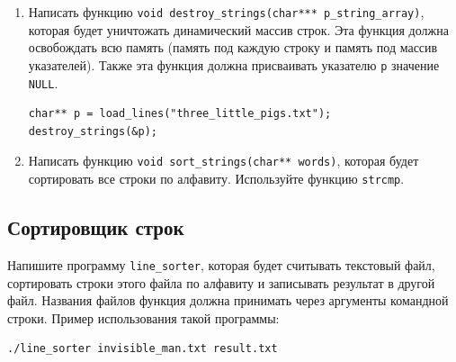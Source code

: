 \documentclass{article}
\begin{document}
\begin{enumerate}
\item Написать функцию \texttt{void destroy\_strings(char*** p\_string\_array)}, которая будет уничтожать динамический массив строк. Эта функция должна освобождать всю память (память под каждую строку и память под массив указателей). Также эта функция должна присваивать указателю \texttt{p} значение \texttt{NULL}.
\begin{lstlisting}
char** p = load_lines("three_little_pigs.txt");
destroy_strings(&p);
\end{lstlisting}

\item Написать функцию \texttt{void sort\_strings(char** words)}, которая будет сортировать все строки по алфавиту. Используйте функцию \texttt{strcmp}.
\end{enumerate}

\subsection{Сортировщик строк}
Напишите программу \texttt{line\_sorter}, которая будет считывать текстовый файл, сортировать строки этого файла по алфавиту и записывать результат в другой файл. Названия файлов функция должна принимать через аргументы командной строки.
Пример использования такой программы:

\begin{verbatim}
./line_sorter invisible_man.txt result.txt
\end{verbatim}
\end{document}
